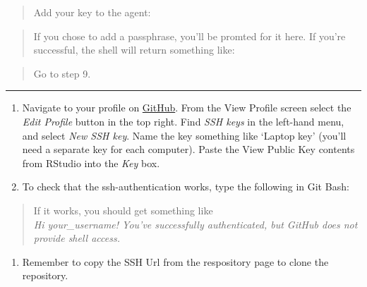 \documentclass[12pt,]{article}
\providecommand{\tightlist}{%
  \setlength{\itemsep}{0pt}\setlength{\parskip}{0pt}}
\begin{document}
\begin{quote}
Add your key to the agent:
\end{quote}

\begin{quote}
\colorbox{light-gray}{}
\end{quote}

\begin{quote}
If you chose to add a passphrase, you'll be promted for it here. If
you're successful, the shell will return something like:
\end{quote}

\begin{quote}
\colorbox{light-gray}{}
\end{quote}

\begin{quote}
Go to step 9.
\end{quote}

\begin{center}\rule{0.5\linewidth}{\linethickness}\end{center}

\begin{enumerate}
\def\labelenumi{\arabic{enumi}.}
\setcounter{enumi}{8}
\item
  Navigate to your profile on \href{www.github.com}{GitHub}. From the
  View Profile screen select the \emph{Edit Profile} button in the top
  right. Find \emph{SSH keys} in the left-hand menu, and select
  \emph{New SSH key}. Name the key something like `Laptop key' (you'll
  need a separate key for each computer). Paste the View Public Key
  contents from RStudio into the \emph{Key} box.
\item
  To check that the ssh-authentication works, type the following in Git
  Bash:
\end{enumerate}

\begin{quote}
\colorbox{light-gray}{}
\end{quote}

\begin{quote}
If it works, you should get something like\\
\emph{Hi your\_username! You've successfully authenticated, but GitHub
does not provide shell access.}
\end{quote}

\begin{enumerate}
\def\labelenumi{\arabic{enumi}.}
\setcounter{enumi}{10}
\tightlist
\item
  Remember to copy the SSH Url from the respository page to clone the
  repository.
\end{enumerate}
\end{document}

